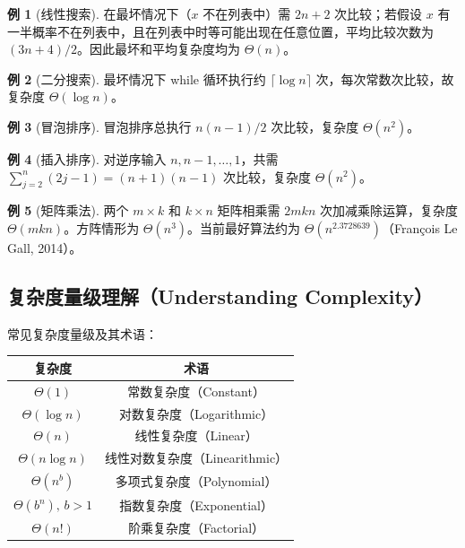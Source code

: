\documentclass[UTF8,11pt,a4paper]{ctexbook}   %
\theoremstyle{definition}
\newtheorem{example}{例}[section]
\begin{document}
\begin{example}[线性搜索]
在最坏情况下（$x$ 不在列表中）需 $2n+2$ 次比较；若假设 $x$ 有一半概率不在列表中，且在列表中时等可能出现在任意位置，平均比较次数为 $(3n+4)/2$。因此最坏和平均复杂度均为 $\Theta(n)$。
\end{example}

\begin{example}[二分搜索]
最坏情况下 while 循环执行约 $\lceil \log n \rceil$ 次，每次常数次比较，故复杂度 $\Theta(\log n)$。
\end{example}

\begin{example}[冒泡排序]
冒泡排序总执行 $n(n-1)/2$ 次比较，复杂度 $\Theta(n^2)$。
\end{example}

\begin{example}[插入排序]
对逆序输入 $n, n-1, \dots, 1$，共需 $\sum_{j=2}^n (2j-1) = (n+1)(n-1)$ 次比较，复杂度 $\Theta(n^2)$。
\end{example}

\begin{example}[矩阵乘法]
两个 $m \times k$ 和 $k \times n$ 矩阵相乘需 $2mkn$ 次加减乘除运算，复杂度 $\Theta(mkn)$。方阵情形为 $\Theta(n^3)$。当前最好算法约为 $\Theta(n^{2.3728639})$（François Le Gall, 2014）。
\end{example}

\subsection{复杂度量级理解（Understanding Complexity）}

常见复杂度量级及其术语：

\begin{table}[htbp]
\centering
\begin{tabular}{|c|c|}
\hline
\textbf{复杂度} & \textbf{术语} \\
\hline
$\Theta(1)$ & 常数复杂度（Constant） \\
$\Theta(\log n)$ & 对数复杂度（Logarithmic） \\
$\Theta(n)$ & 线性复杂度（Linear） \\
$\Theta(n \log n)$ & 线性对数复杂度（Linearithmic） \\
$\Theta(n^b)$ & 多项式复杂度（Polynomial） \\
$\Theta(b^n),\, b>1$ & 指数复杂度（Exponential） \\
$\Theta(n!)$ & 阶乘复杂度（Factorial） \\
\hline
\end{tabular}
\end{table}
\end{document}
